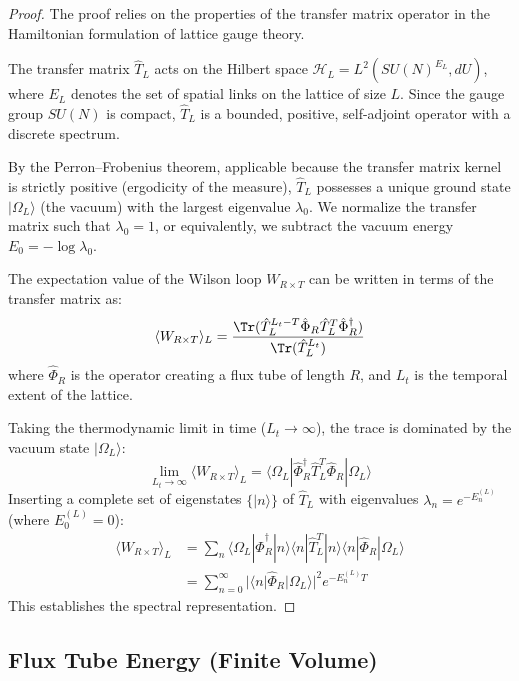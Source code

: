 \begin{proof}
The proof relies on the properties of the transfer matrix operator in the Hamiltonian formulation of lattice gauge theory.

The transfer matrix $\hat{T}_L$ acts on the Hilbert space $\mathcal{H}_L = L^2(SU(N)^{E_L}, dU)$, where $E_L$ denotes the set of spatial links on the lattice of size $L$. Since the gauge group $SU(N)$ is compact, $\hat{T}_L$ is a bounded, positive, self-adjoint operator with a discrete spectrum.

By the Perron--Frobenius theorem, applicable because the transfer matrix kernel is strictly positive (ergodicity of the measure), $\hat{T}_L$ possesses a unique ground state $|\Omega_L\rangle$ (the vacuum) with the largest eigenvalue $\lambda_0$. We normalize the transfer matrix such that $\lambda_0 = 1$, or equivalently, we subtract the vacuum energy $E_0 = -\log \lambda_0$.

The expectation value of the Wilson loop $W_{R \times T}$ can be written in terms of the transfer matrix as:
\begin{equation}
\langle W_{R \times T} \rangle_L = \frac{\Tr(\hat{T}_L^{L_t - T} \hat{\Phi}_R \hat{T}_L^T \hat{\Phi}_R^\dagger)}{\Tr(\hat{T}_L^{L_t})}
\end{equation}
where $\hat{\Phi}_R$ is the operator creating a flux tube of length $R$, and $L_t$ is the temporal extent of the lattice.

Taking the thermodynamic limit in time ($L_t \to \infty$), the trace is dominated by the vacuum state $|\Omega_L\rangle$:
\begin{equation}
\lim_{L_t \to \infty} \langle W_{R \times T} \rangle_L = \langle \Omega_L | \hat{\Phi}_R^\dagger \hat{T}_L^T \hat{\Phi}_R | \Omega_L \rangle
\end{equation}
Inserting a complete set of eigenstates $\{|n\rangle\}$ of $\hat{T}_L$ with eigenvalues $\lambda_n = e^{-E_n^{(L)}}$ (where $E_0^{(L)} = 0$):
\begin{align}
\langle W_{R \times T} \rangle_L &= \sum_{n} \langle \Omega_L | \hat{\Phi}_R^\dagger | n \rangle \langle n | \hat{T}_L^T | n \rangle \langle n | \hat{\Phi}_R | \Omega_L \rangle \\
&= \sum_{n=0}^\infty |\langle n | \hat{\Phi}_R | \Omega_L \rangle|^2 e^{-E_n^{(L)} T}
\end{align}
This establishes the spectral representation.
\end{proof}

\subsection{Flux Tube Energy (Finite Volume)}


